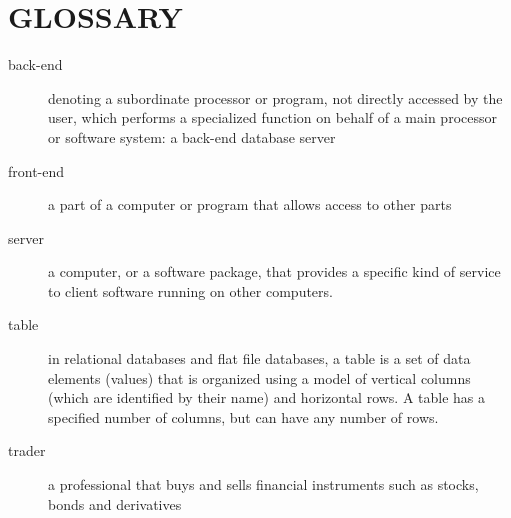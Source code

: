 \section*{GLOSSARY} %
\label{sec:glossary}
	\begin{description}
		
		\item[back-end]
denoting a subordinate processor or program, not directly accessed by the user, which performs a specialized function on behalf of a main processor or software system: a back-end database server

		\item[front-end]
a part of a computer or program that allows access to other parts

		\item[server]
a computer, or a software package, that provides a specific kind of service to client software running on other computers.

		\item[table]
in relational databases and flat file databases, a table is a set of data elements (values) that is organized using a model of vertical columns (which are identified by their name) and horizontal rows. A table has a specified number of columns, but can have any number of rows.

		\item[trader]
a professional that buys and sells financial instruments such as stocks, bonds and derivatives

	\end{description}
